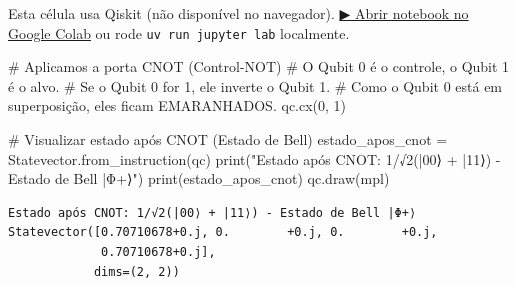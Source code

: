 \documentclass[
  brazilian,
]{report}
\newenvironment{Shaded}{\begin{snugshade}}{\end{snugshade}}
\newcommand{\BuiltInTok}[1]{\textcolor[rgb]{0.00,0.23,0.31}{#1}}
\newcommand{\CommentTok}[1]{\textcolor[rgb]{0.37,0.37,0.37}{#1}}
\newcommand{\DecValTok}[1]{\textcolor[rgb]{0.68,0.00,0.00}{#1}}
\newcommand{\NormalTok}[1]{\textcolor[rgb]{0.00,0.23,0.31}{#1}}
\newcommand{\OperatorTok}[1]{\textcolor[rgb]{0.37,0.37,0.37}{#1}}
\newcommand{\StringTok}[1]{\textcolor[rgb]{0.13,0.47,0.30}{#1}}
\begin{document}
\begin{tcolorbox}[enhanced jigsaw, arc=.35mm, bottomrule=.15mm, bottomtitle=1mm, breakable, colback=white, colbacktitle=quarto-callout-warning-color!10!white, colframe=quarto-callout-warning-color-frame, coltitle=black, left=2mm, leftrule=.75mm, opacityback=0, opacitybacktitle=0.6, rightrule=.15mm, title=\textcolor{quarto-callout-warning-color}{\faExclamationTriangle}\hspace{0.5em}{⚛️ Célula Qiskit --- execute no Colab ou localmente}, titlerule=0mm, toprule=.15mm, toptitle=1mm]

Esta célula usa Qiskit (não disponível no navegador).
\href{https://colab.research.google.com/github/maxwellamaral/aula-quantum/blob/main/notebooks/01-intro.ipynb}{▶
Abrir notebook no Google Colab} ou rode \texttt{uv\ run\ jupyter\ lab}
localmente.

\begin{Shaded}
\begin{Highlighting}[]

\CommentTok{\# Aplicamos a porta CNOT (Control{-}NOT)}
\CommentTok{\# O Qubit 0 é o controle, o Qubit 1 é o alvo.}
\CommentTok{\# Se o Qubit 0 for 1, ele inverte o Qubit 1.}
\CommentTok{\# Como o Qubit 0 está em superposição, eles ficam EMARANHADOS.}
\NormalTok{qc.cx(}\DecValTok{0}\NormalTok{, }\DecValTok{1}\NormalTok{)}

\CommentTok{\# Visualizar estado após CNOT (Estado de Bell)}
\NormalTok{estado\_apos\_cnot }\OperatorTok{=}\NormalTok{ Statevector.from\_instruction(qc)}
\BuiltInTok{print}\NormalTok{(}\StringTok{"Estado após CNOT: 1/√2(|00⟩ + |11⟩) {-} Estado de Bell |Φ+⟩"}\NormalTok{)}
\BuiltInTok{print}\NormalTok{(estado\_apos\_cnot)}
\NormalTok{qc.draw(}\StringTok{\textquotesingle{}mpl\textquotesingle{}}\NormalTok{)}
\end{Highlighting}
\end{Shaded}

\end{tcolorbox}

\begin{verbatim}
Estado após CNOT: 1/√2(|00⟩ + |11⟩) - Estado de Bell |Φ+⟩
Statevector([0.70710678+0.j, 0.        +0.j, 0.        +0.j,
             0.70710678+0.j],
            dims=(2, 2))
\end{verbatim}
\end{document}
